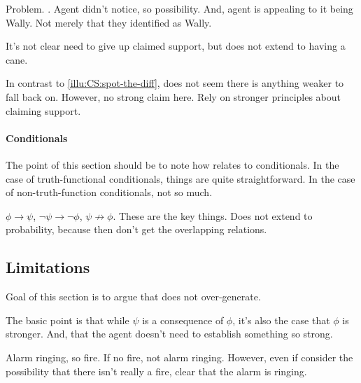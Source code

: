 \begin{note}
  Problem.
  \requ{}.
  Agent didn't notice, so possibility.
  And, agent is appealing to it being Wally.
  Not merely that they identified as Wally.

  It's not clear need to give up claimed support, but does not extend to having a cane.

  In contrast to \ref{illu:CS:spot-the-diff}, does not seem there is anything weaker to fall back on.
  However, no strong claim here.
  Rely on stronger principles about claiming support.
\end{note}

\paragraph{Conditionals}

\begin{note}
  \color{red}
  The point of this section should be to note how \ideaCS{} relates to conditionals.
  In the case of truth-functional conditionals, things are quite straightforward.
  In the case of non-truth-function conditionals, not so much.
\end{note}

\begin{note}
  \(\phi \rightarrow \psi\), \(\lnot\psi \rightarrow \lnot\phi\), \(\psi \not\rightarrow \phi\).
  These are the key things.
  Does not extend to probability, because then don't get the overlapping relations.
\end{note}

\subsection{Limitations}
\label{sec:limitations}

\begin{note}
  Goal of this section is to argue that \ideaCS{} does not over-generate.
\end{note}

\begin{note}
  The basic point is that while \(\psi\) is a consequence of \(\phi\), it's also the case that \(\phi\) is stronger.
  And, that the agent doesn't need to establish something so strong.
\end{note}

\begin{note}
  Alarm ringing, so fire.
  If no fire, not alarm ringing.
  However, even if consider the possibility that there isn't really a fire, clear that the alarm is ringing.
\end{note}

